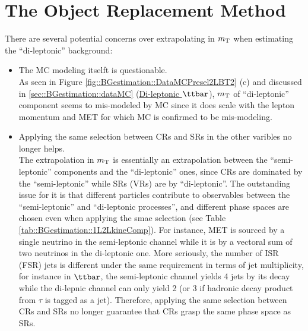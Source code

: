 \section{The Object Replacement Method} \label{sec::BGestimation::objRep}
There are several potential concerns over extrapolating in $m_{\mathrm{T}}$ when estimating the ``di-leptonic'' background:
\begin{itemize}
\item The MC modeling itselft is questionable. \\
As seen in Figure \ref{fig::BGestimation::DataMCPresel2LBT2} (c) and discussed in \ref{sec::BGestimation::dataMC} (\underline{Di-leptonic $\ttbar$}),
$m_{\mathrm{T}}$ of ``di-leptonic'' component seems to mis-modeled by MC since it does scale with the lepton momentum and MET for which MC is confirmed to be mis-modeling.


\item Applying the same selection between CRs and SRs in the other varibles no longer helps. \\
The extrapolation in $m_{\mathrm{T}}$ is essentially an extrapolation between the ``semi-leptonic'' components  and the ``di-leptonic'' ones, since CRs are dominated by the ``semi-leptonic'' while SRs (VRs) are by ``di-leptonic''. The outstanding issue for it is that different particles contribute to observables between the ``semi-leptonic'' and ``di-leptonic processes'', and different phase spaces are chosen even when applying the smae selection (see Table \ref{tab::BGestimation::1L2LkineComp}).
For instance, MET is sourced by a single neutrino in the semi-leptonic channel while it is by a vectoral sum of two neutrinos in the di-leptonic one. More seriously, the number of ISR (FSR) jets is different under the same requirement in terms of jet multiplicity, for instance in $\ttbar$, the semi-leptonic channel yields 4 jets by its decay while the di-lepnic channel can only yield 2 (or 3 if hadronic decay product from $\tau$ is tagged as a jet). 
Therefore, applying the same selection between CRs and SRs no longer guarantee that CRs grasp the same phase space as SRs. 


\end{itemize}



